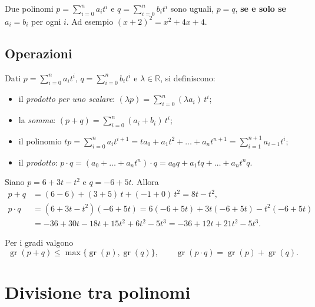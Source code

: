 \documentclass[11pt,a4paper]{article}
\begin{document}
\begin{osservazione}
Due polinomi $p = \sum_{i=0}^{n} a_i t^i$ e $q = \sum_{i=0}^{n} b_i t^i$ sono
uguali, $p = q$, \textbf{se e solo se} $a_i = b_i$ per ogni $i$. Ad esempio
$(x+2)^2 = x^2 + 4x + 4$.
\end{osservazione}

\subsection{Operazioni}

Dati $p = \sum_{i=0}^{n} a_i t^i$, $q = \sum_{i=0}^{n} b_i t^i$ e
$\lambda \in \mathbb{R}$, si definiscono:
\begin{itemize}
    \item il \emph{prodotto per uno scalare}:
          $(\lambda p) = \sum_{i=0}^{n} (\lambda a_i)\, t^i$;
    \item la \emph{somma}: $(p + q) = \sum_{i=0}^{n} (a_i + b_i)\, t^i$;
    \item il polinomio $t p = \sum_{i=0}^{n} a_i t^{i+1}
          = t a_0 + a_1 t^2 + \dots + a_n t^{n+1}
          = \sum_{i=1}^{n+1} a_{i-1} t^i$;
    \item il \emph{prodotto}:
          $p \cdot q = (a_0 + \dots + a_n t^n) \cdot q
          = a_0 q + a_1 t q + \dots + a_n t^n q$.
\end{itemize}

\begin{esempio}
Siano $p = 6 + 3t - t^2$ e $q = -6 + 5t$. Allora
\begin{align*}
p + q &= (6 - 6) + (3 + 5)\,t + (-1 + 0)\,t^2 = 8t - t^2,\\
p \cdot q &= (6 + 3t - t^2)(-6 + 5t)
  = 6(-6 + 5t) + 3t(-6 + 5t) - t^2(-6 + 5t)\\
  &= -36 + 30t - 18t + 15t^2 + 6t^2 - 5t^3
  = -36 + 12t + 21t^2 - 5t^3 .
\end{align*}
\end{esempio}

\begin{osservazione}
Per i gradi valgono
\[
  \operatorname{gr}(p + q) \leq \max\{\operatorname{gr}(p), \operatorname{gr}(q)\},
  \qquad
  \operatorname{gr}(p \cdot q) = \operatorname{gr}(p) + \operatorname{gr}(q).
\]
\end{osservazione}

\section{Divisione tra polinomi}
\end{document}
